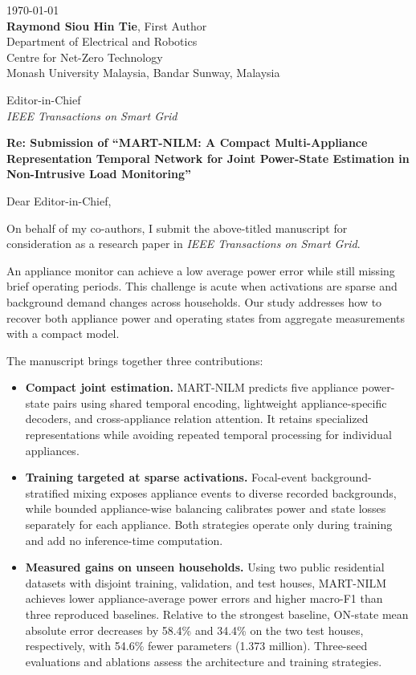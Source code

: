 \documentclass[10pt]{article}
\begin{document}
\begin{flushright}
\today\\[1.25em]
\textbf{Raymond Siou Hin Tie}, First Author\\
Department of Electrical and Robotics\\
Centre for Net-Zero Technology\\
Monash University Malaysia, Bandar Sunway, Malaysia
\end{flushright}

\vspace{1em}

Editor-in-Chief\\
\textit{IEEE Transactions on Smart Grid}

\vspace{0.9em}

\textbf{Re: Submission of ``MART-NILM: A Compact Multi-Appliance Representation Temporal Network for Joint Power-State Estimation in Non-Intrusive Load Monitoring''}

Dear Editor-in-Chief,

On behalf of my co-authors, I submit the above-titled manuscript for consideration as a research paper in \textit{IEEE Transactions on Smart Grid}.

An appliance monitor can achieve a low average power error while still missing brief operating periods. This challenge is acute when activations are sparse and background demand changes across households. Our study addresses how to recover both appliance power and operating states from aggregate measurements with a compact model.

The manuscript brings together three contributions:
\begin{itemize}
    \setlength{\itemsep}{0.25em}
    \setlength{\topsep}{0.25em}
    \item \textbf{Compact joint estimation.} MART-NILM predicts five appliance power-state pairs using shared temporal encoding, lightweight appliance-specific decoders, and cross-appliance relation attention. It retains specialized representations while avoiding repeated temporal processing for individual appliances.
    \item \textbf{Training targeted at sparse activations.} Focal-event background-stratified mixing exposes appliance events to diverse recorded backgrounds, while bounded appliance-wise balancing calibrates power and state losses separately for each appliance. Both strategies operate only during training and add no inference-time computation.
    \item \textbf{Measured gains on unseen households.} Using two public residential datasets with disjoint training, validation, and test houses, MART-NILM achieves lower appliance-average power errors and higher macro-F1 than three reproduced baselines. Relative to the strongest baseline, ON-state mean absolute error decreases by 58.4\% and 34.4\% on the two test houses, respectively, with 54.6\% fewer parameters (1.373 million). Three-seed evaluations and ablations assess the architecture and training strategies.
\end{itemize}
\end{document}

